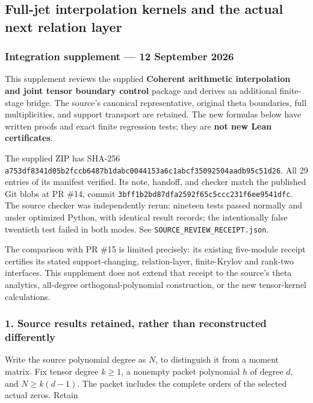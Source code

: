 


\subsection{Full-jet interpolation kernels and the actual next relation
layer}\label{kernel_layer:full-jet-interpolation-kernels-and-the-actual-next-relation-layer}

\subsubsection{Integration supplement --- 12 September
2026}\label{kernel_layer:integration-supplement-12-september-2026}

This supplement reviews the supplied \textbf{Coherent arithmetic
interpolation and joint tensor boundary control} package and derives an
additional finite-stage bridge. The source's canonical representative,
original theta boundaries, full multiplicities, and support transport
are retained. The new formulas below have written proofs and exact
finite regression tests; they are \textbf{not new Lean certificates}.

The supplied ZIP has SHA-256
\nolinkurl{a753df8341d05b2fccb6487b1dabc0044153a6c1abcf35092504aadb95c51d26}.
All 29 entries of its manifest verified. Its note, handoff, and checker
match the published Git blobs at PR \#14, commit
\nolinkurl{3bff1b2bd87dfa2592f65c5ccc231f6ee9541dfc}. The source checker
was independently rerun: nineteen tests passed normally and under
optimized Python, with identical result records; the intentionally false
twentieth test failed in both modes. See
\nolinkurl{SOURCE_REVIEW_RECEIPT.json}.

The comparison with PR \#15 is limited precisely: its existing
five-module receipt certifies its stated support-changing,
relation-layer, finite-Krylov and rank-two interfaces. This supplement
does not extend that receipt to the source's theta analytics, all-degree
orthogonal-polynomial construction, or the new tensor-kernel
calculations.

\subsubsection{1. Source results retained, rather than reconstructed
differently}\label{kernel_layer:source-results-retained-rather-than-reconstructed-differently}

Write the source polynomial degree as \(N\), to distinguish it from a
moment matrix. Fix tensor degree \(k\ge1\), a nonempty packet polynomial
\(h\) of degree \(d\), and \(N\ge k(d-1)\). The packet includes the
complete orders of the selected actual zeros. Retain

